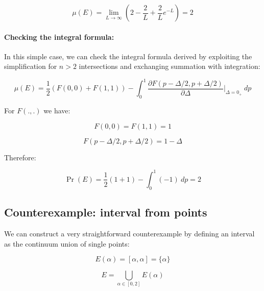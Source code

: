 \documentclass{article}
\theoremstyle{definition}
\begin{document}
\begin{appendices}
\begin{equation}
\boxed{
    \mu(E) = \lim_{L \to \infty} 
    \left(
    2 - \frac{2}{L} + \frac{2}{L} e^{-L}
    \right)
    =
    2
    }
\end{equation}

\paragraph{Checking the integral formula:}
In this simple case, we can check the integral formula derived by exploiting the simplification for $n>2$ intersections and exchanging summation with integration:

\begin{equation}
    \mu(E) 
    = 
    \frac{1}{2} \left ( F(0,0)+F(1,1) \right ) 
    - \int_0^1
    \frac{\partial
    F(p - \Delta/2, p + \Delta/2) 
    }{\partial \Delta}
    \Bigg |_{\Delta=0_+}
    \ dp
\end{equation}

For $F(.,.)$ we have:

\begin{equation}
    F(0,0)=F(1,1)=1
\end{equation}

\begin{equation}
    F(p - \Delta/2, p + \Delta/2)
    =
    1-\Delta
\end{equation}

Therefore:

\begin{equation}
\boxed{
    \Pr(E) 
    = 
    \frac{1}{2} \left ( 1 + 1 \right ) 
    - \int_0^1
    (-1)
    \ dp
    =
    2
    }
\end{equation}

\subsection{Counterexample: interval from points}

We can construct a very straightforward counterexample by defining an interval as the continuum union of single points:

\begin{equation}
    E(\alpha) = [\alpha, \alpha] = \{\alpha\}
\end{equation}

\begin{equation}
    E = \bigcup_{\alpha \in [0,2]} E(\alpha)
\end{equation}


\end{appendices}
\end{document}
